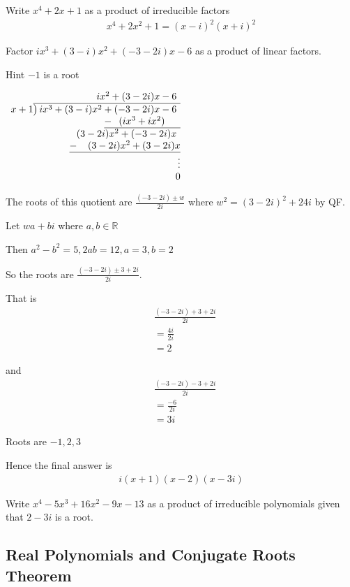 \documentclass{article}
\begin{document}
Write $x^4+2x+1$ as a product of irreducible factors
\begin{align*}
    x^4+2x^2+1 = (x-i)^2(x+i)^2
\end{align*}

Factor $ix^3 + (3-i)x^2 + (-3-2i)x - 6$ as a product of linear factors.

Hint $-1$ is a root

$\begin{array}{r}
ix^2 + (3-2i)x -6\phantom{)}   \\
x+1{\overline{\smash{\big)}\,ix^3 + (3-i)x^2 + (-3-2i)x - 6\phantom{)}}}\\
\underline{-~\phantom{(}(ix^3+ix^2)\phantom{-b)}}\\
(3-2i)x^2 + (-3-2i)x\phantom{)}\\ 
\underline{-~\phantom{()}(3-2i)x^2 + (3-2i)x}\\ 
\vdots\\
0
\end{array}$

The roots of this quotient are $\frac{(-3-2i)\pm w}{2i}$ where $w^2 = (3-2i)^2 + 24i$ by QF. 

Let $wa + bi$ where $a,b \in \mathbb{R}$

Then $a^2 - b^2 = 5, 2ab = 12, a =3, b =2$

So the roots are $\frac{(-3-2i)\pm 3 + 2i}{2i}$.

That is
\begin{align*}
    &\frac{(-3-2i)+3+2i}{2i}\\
    &= \frac{4i}{2i}\\
    &= 2
\end{align*}

and 
\begin{align*}
    &\frac{(-3-2i)-3+2i}{2i}\\
    &= \frac{-6}{2i}\\
    &= 3i
\end{align*}

Roots are $-1,2,3$

Hence the final answer is 
\begin{align*}
    i(x+1)(x-2)(x-3i)
\end{align*}

Write $x^4-5x^3 +16x^2-9x-13$ as a product of irreducible polynomials given that $2-3i$ is a root. 

\subsection{Real Polynomials and Conjugate Roots Theorem}
\end{document}
